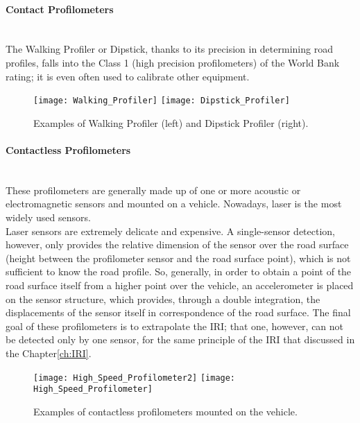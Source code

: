 \documentclass[tesi]{subfiles}
\begin{document}
\begin{enumerate}
\begin{description}
\end{description}

\paragraph{Contact Profilometers}\leavevmode\\
The Walking Profiler or Dipstick\cite{little_book}, thanks to its precision in determining road profiles, falls into the Class 1 (high precision profilometers) of the World Bank rating\cite{sayers1995calculation}; it is even often used to calibrate other equipment.


\begin{figure}[H]
\centering
\texttt{[image: Walking\_Profiler]}
\hspace{1.5cm}
\texttt{[image: Dipstick\_Profiler]}
\caption{Examples of Walking Profiler (left) and Dipstick Profiler (right).}
\label{fig:contact_profiler}
\end{figure}

\paragraph{Contactless Profilometers}\leavevmode\\  \noindent These profilometers are generally made up of one or more acoustic or electromagnetic sensors and mounted on a vehicle. Nowadays, laser is the most widely used sensors.\\ Laser sensors are extremely delicate and expensive. A single-sensor detection, however, only provides the relative dimension of the sensor over the road surface (height between the profilometer sensor and the road surface point), which is not sufficient to know the road profile. So, generally, in order to obtain a point of the road surface itself from a higher point over the vehicle, an accelerometer is placed on the sensor structure, which provides, through a double integration, the displacements of the sensor itself in correspondence of the road surface. The final goal of these profilometers is to extrapolate the IRI; that one, however, can not be detected only by one sensor, for the same principle of the IRI that discussed in the Chapter\ref{ch:IRI}.

\vspace{0.35cm}
\begin{figure}[H]
\centering
\texttt{[image: High\_Speed\_Profilometer2]}
\hspace{1cm}
\texttt{[image: High\_Speed\_Profilometer]}
\caption{Examples of contactless profilometers mounted on the vehicle.}
\label{fig:contact_less_profiler}
\end{figure}


\end{enumerate}
\end{document}
